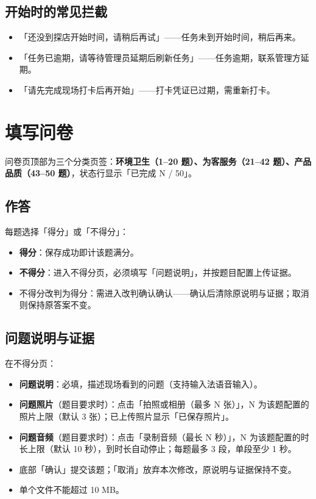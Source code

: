 \documentclass[12pt,a4paper,fontset=none]{ctexart}
\begin{document}
\subsection{开始时的常见拦截}
\begin{itemize}
\item 「还没到探店开始时间，请稍后再试」——任务未到开始时间，稍后再来。
\item 「任务已逾期，请等待管理员延期后刷新任务」——任务逾期，联系管理方延期。
\item 「请先完成现场打卡后再开始」——打卡凭证已过期，需重新打卡。
\end{itemize}

\section{填写问卷}

问卷页顶部为三个分类页签：\textbf{环境卫生（1–20 题）、为客服务（21–42 题）、产品品质（43–50 题）}，状态行显示「已完成 N / 50」。

\subsection{作答}
每题选择「得分」或「不得分」：
\begin{itemize}
\item \textbf{得分}：保存成功即计该题满分。
\item \textbf{不得分}：进入不得分页，必须填写「问题说明」，并按题目配置上传证据。
\item 不得分改判为得分：需进入改判确认确认——确认后清除原说明与证据；取消则保持原答案不变。
\end{itemize}


\subsection{问题说明与证据}
在不得分页：
\begin{itemize}
\item \textbf{问题说明}：必填，描述现场看到的问题（支持输入法语音输入）。
\item \textbf{问题照片}（题目要求时）：点击「拍照或相册（最多 N 张）」，N 为该题配置的照片上限（默认 3 张）；已上传照片显示「已保存照片」。
\item \textbf{问题音频}（题目要求时）：点击「录制音频（最长 N 秒）」，N 为该题配置的时长上限（默认 10 秒），到时长自动停止；每题最多 3 段，单段至少 1 秒。
\item 底部「确认」提交该题；「取消」放弃本次修改，原说明与证据保持不变。
\item 单个文件不能超过 10 MB。
\end{itemize}
\end{document}
